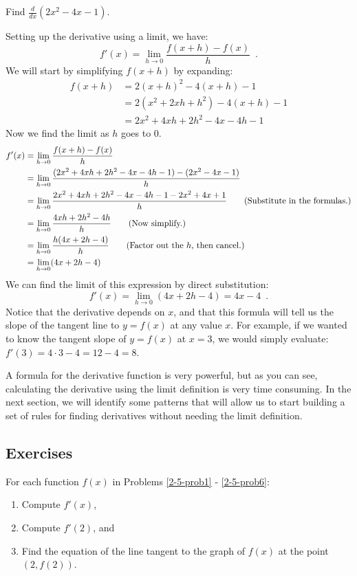 \begin{example}
Find $\frac{d}{dx}(2x^2-4x-1)$.

\begin{solution} Setting up the derivative using a limit, we have:
$$f'(x)=\lim_{h\to 0}\frac{f(x+h)-f(x)}{h} \enspace .$$
We will start by simplifying $f(x+h)$ by expanding:
\begin{align*}
		f(x+h) &= 2(x+h)^2-4(x+h)-1 \\
		&= 2(x^2+2xh+h^2)-4(x+h)-1 \\
		&= 2x^2+4xh+2h^2-4x-4h-1
	\end{align*}
Now we find the limit as $h$ goes to 0.
\begin{align*}
		f'(x) &= \lim_{h\to 0}\frac{f(x+h)-f(x)}{h} \\
		&= \lim_{h\to 0} \frac{(2x^2+4xh+2h^2-4x-4h-1)-(2x^2-4x-1)}{h} \\
		&= \lim_{h\to 0} \frac{2x^2+4xh+2h^2-4x-4h-1-2x^2+4x+1}{h} \qquad \text{(Substitute in the formulas.)} \\
		&= \lim_{h\to 0} \frac{4xh+2h^2-4h}{h} \qquad \text{(Now simplify.)}\\
		&= \lim_{h\to 0} \frac{h(4x+2h-4)}{h} \qquad \text{(Factor out the \( h \), then cancel.)} \\
		&= \lim_{h\to 0} (4x+2h-4)
	\end{align*}
We can find the limit of this expression by direct substitution:
$$f'(x)=\lim_{h\to 0} (4x+2h-4)=4x-4 \enspace .$$
Notice that the derivative depends on $x$, and that this formula will tell us the slope of the tangent line to $y=f(x)$ at any value $x$. For example, if we wanted to know the tangent slope of $y=f(x)$ at $x=3$, we would simply evaluate: $f'(3)=4\cdot 3-4= 12-4 = 8$.
\end{solution}\end{example}
A formula for the derivative function is very powerful, but as you can see, calculating the derivative using the limit definition is very time consuming. In the next section, we will identify some patterns that will allow us to start building a set of rules for finding derivatives without needing the limit definition.

\subsection{Exercises}
    For each function  $f(x)$  in Problems  \ref{2-5-prob1} - \ref{2-5-prob6}: 
    \begin{enumerate}[label=(\alph*)]
    \item Compute $f'(x)$,
    \item Compute $f'(2)$, and
    \item Find the equation of the line tangent to the graph of $f(x)$ at the point $(2, f(2))$.
    \end{enumerate}

